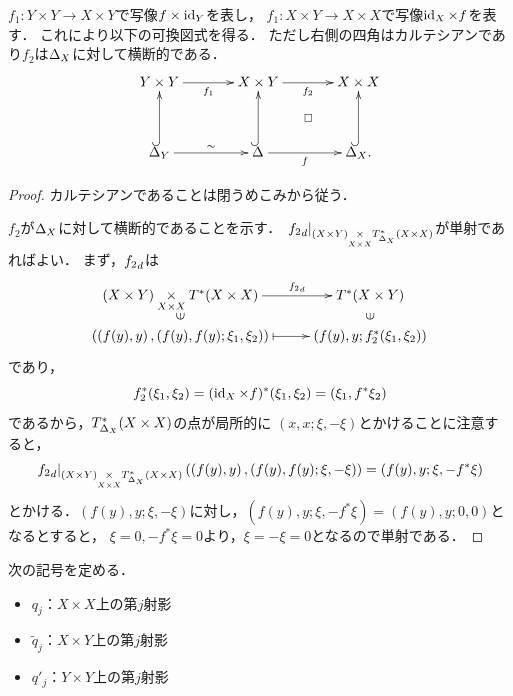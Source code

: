 \(f_1\colon Y\times Y\to X\times Y\)で写像\(f\times \id_Y\)を表し，
\(f_1\colon X\times Y\to X\times X\)で写像\(\id_X\times f\)を表す．
これにより以下の可換図式を得る．
ただし右側の四角はカルテシアンであり\(f_2\)は\(\diag[X]\)に対して横断的である．
\begin{equation}\label{eq:4.4.3}
  \vcenter{\xymatrix@C=36pt@R=36pt{
    Y\times Y
    \ar[r]_-{f_1}
    &
    X\times Y
    \ar@{}[rd]|\square
    \ar[r]_-{f_2}
    &
    X\times X
    \\
    \diag[Y]  
    \ar@{^{(}->}[u]^-{}
    \ar[r]^-{{\sim}}
    &
    \diag[]
    \ar@{^{(}->}[u]^-{}
    \ar[r]_-{f}
    &
    \diag[X].
    \ar@{^{(}->}[u]^-{}
  }}
\end{equation}
\begin{proof}
  カルテシアンであることは閉うめこみから従う．

  \(f_2\)が\(\diag[X]\)に対して横断的であることを示す．
  \(\mres[{\mdiff[f_2]}]{(X\times Y)\pb[X\times X]T^{\ast}_{\diag[X]}(X\times X)}\)が単射であればよい．
  まず，\(\mdiff[f_2]\)は
  \[    
    \vcenter{\xymatrix@C=26pt@R=10pt{
      (X\times Y)\pb[X\times X]T^{\ast}(X\times X)
      \ar[r]^-{\mdiff[f_2]}
      &
      T^{\ast}(X\times Y)
      \\
      \left(\left(f(y),y\right),(f(y),f(y);\xi_1,\xi_2)\right)
      \ar@{}[u]|{\rotatebox{90}{\(\in\)}}
      \ar@{{|}->}[r]_-{}
      &
      \ar@{}[u]|{\rotatebox{90}{\(\in\)}}
      \left(f(y),y;f_{2}^{\ast}(\xi_1,\xi_2)\right)
    }}
  \]であり，
  \[
    f_2^{\ast}(\xi_1,\xi_2)
    =
    (\id_X\times f)^{\ast}(\xi_1,\xi_2)
    =(\xi_1,f^{\ast}\xi_2)
  \]であるから，\(T^{\ast}_{\diag[X]}(X\times X)\)の点が局所的に
  \((x,x;\xi,-\xi)\)とかけることに注意すると，
  \[
    \mres[{\mdiff[f_2]}]{(X\times Y)\pb[X\times X]T^{\ast}_{\diag[X]}(X\times X)}
    \left(\left(f(y),y\right),(f(y),f(y);\xi,-\xi)\right)
    =(f(y),y;\xi,-f^{\ast}\xi)
  \]
  とかける．\((f(y),y;\xi,-\xi)\)に対し，\((f(y),y;\xi,-f^{\ast}\xi)=(f(y),y;0,0)\)となるとすると，
  \(\xi=0,-f^{\ast}\xi=0\)より，\(\xi=-\xi=0\)となるので単射である．
\end{proof}
次の記号を定める．
\begin{itemize}
  \item \(q_j\)：\(X\times X\)上の第\(j\)射影
  \item \(\tilde{q}_{j}\)：\(X\times Y\)上の第\(j\)射影
  \item \(q'_j\)：\(Y\times Y\)上の第\(j\)射影
\end{itemize}
